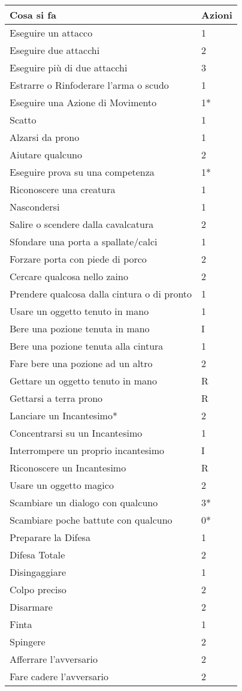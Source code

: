 \documentclass[a4paper,12 pt,openany]{book}
\begin{document}
\begin{textblock*}{8.3cm}
\noindent\begin{tabular}{ll}
	\textbf{Cosa si fa} & \textbf{Azioni}\\
	\hline
	Eseguire un attacco& 1\\
	Eseguire due attacchi& 2\\
	Eseguire più di due attacchi& 3\\
	Estrarre o Rinfoderare l'arma o scudo& 1\\
	\hline
	Eseguire una Azione di Movimento &1*\\
	Scatto & 1\\
	Alzarsi da prono& 1\\
	\hline
	Aiutare qualcuno& 2\\
	Eseguire prova su una competenza& 1*\\
	Riconoscere una creatura& 1\\
	Nascondersi& 1\\
	\hline
	Salire o scendere dalla cavalcatura& 2\\
	Sfondare una porta a spallate/calci& 1\\
	Forzare porta con piede di porco& 2\\
	\hline
	Cercare qualcosa nello zaino& 2\\
	Prendere qualcosa dalla cintura o di pronto & 1\\
	Usare un oggetto tenuto in mano& 1\\
	\hline
	Bere una pozione tenuta in mano& I\\
	Bere una pozione tenuta alla cintura& 1\\
	Fare bere una pozione ad un altro & 2\\
	\hline
	Gettare un oggetto tenuto in mano& R\\
	Gettarsi a terra prono& R\\
	\hline
	Lanciare un Incantesimo*& 2\\
	Concentrarsi su un Incantesimo& 1\\
	Interrompere un proprio incantesimo & I\\
	Riconoscere un Incantesimo& R\\
	Usare un oggetto magico& 2\\
	\hline
	Scambiare un dialogo con qualcuno& 3*\\
	Scambiare poche battute con qualcuno& 0*\\
	\hline
	Preparare la Difesa & 1\\
	Difesa Totale & 2\\
	Disingaggiare & 1\\
	Colpo preciso & 2\\
	\hline
	Disarmare & 2\\
	Finta & 1\\
	Spingere & 2\\
	Afferrare l'avversario & 2\\
	Fare cadere l'avversario & 2
\end{tabular}


\end{textblock*}
\end{document}
